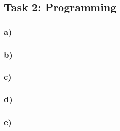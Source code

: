 \newpage
\subsection{Task 2: Programming}


\subsubsection*{a)}

\subsubsection*{b)}

\subsubsection*{c)}

\subsubsection*{d)}

\subsubsection*{e)}